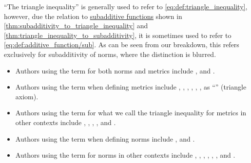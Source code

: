\begin{remark}\label{rem:triangle_inequality_terminology}
  \enquote{The triangle inequality} is generally used to refer to \eqref{eq:def:triangle_inequality}, however, due the relation to \hyperref[def:additive_function/sub]{subadditive functions} shown in \cref{thm:subadditivity_to_triangle_inequality} and \cref{thm:triangle_inequality_to_subadditivity}, it is sometimes used to refer to \eqref{eq:def:additive_function/sub}. As can be seen from our breakdown, this refers exclusively for subadditivity of norms, where the distinction is blurred.

  \begin{itemize}
    \item Authors using the term for both norms and metrics include
    \textcite[3; 191]{WheedenZygmund2015MeasureAndIntegral},
    \textcite[4.3.3]{Tao2022AnalysisI} and
    \textcite[94; 673]{Rotman2015AdvancedModernAlgebraPart1}.

    \item Authors using the term when defining metrics include
    \textcite[217]{Birkhoff1967LatticeTheory},
    \textcite[48]{Carothers2000RealAnalysis},
    \textcite[118]{Kelley1975GeneralTopology},
    \textcite[248]{Engelking1989GeneralTopology},
    \textcite[40]{Schechter1997AnalysisHandbook},
    \textcite[55]{HalmosGivant2009BooleanAlgebras},
    \textcite[15]{ЛюстерникСоболев1965ФункциональныйАнализ} as \enquote{} (triangle axiom).

    \item Authors using the term for what we call the triangle inequality for metrics in other contexts include
    \textcite[161]{Арнольд2014ОДУ},
    \textcite[53]{Боровков1999ТеорияВероятностей},
    \textcite[13]{Зорич2019АнализЧасть2},
    \textcite[\S 1.4]{Rudin1987RealAndComplexAnalysis},
    \textcite[362]{Grätzer2011LatticeTheory} and
    \textcite[\S 9.1.1.1]{Berger1987GeometryI}.

    \item Authors using the term when defining norms include
    \textcite[16]{Clarke2013OptimalControl},
    \textcite[12]{FabianEtAl2001FunctionalAnalysis} and
    \textcite[151]{Folland1999RealAnalysis}.

    \item Authors using the term for norms in other contexts include
    \textcite[7]{BerghLöfström1976InterpolationSpaces},
    \textcite[9]{Ahlfors1979ComplexAnalysis},
    \textcite[21]{Malliavin1995IntegrationAndProbability},
    \textcite[578]{Lang2002Algebra},
    \textcite[13]{Strang2023LinearAlgebra},
    \textcite[def. 1.1.1]{Хелемский2014ФункциональныйАнализ},
    \textcite[112]{Deimling1985NonlinearFA} and
    \textcite[605]{Knapp2016BasicAlgebra}.
  \end{itemize}
\end{remark}

